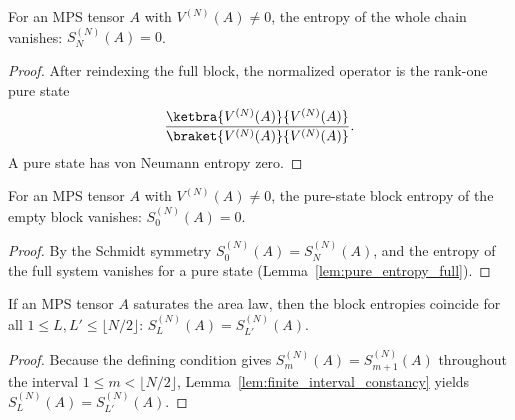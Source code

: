 \begin{lemma}
    \label{lem:pure_entropy_full}
    \leanok
    For an MPS tensor $A$ with $V^{(N)}(A)\neq0$, the entropy of the whole chain
    vanishes: $S_N^{(N)}(A)=0$.
\end{lemma}
\begin{proof}\leanok
    After reindexing the full block, the normalized operator is the rank-one
    pure state
    \begin{align}
        \frac{\ketbra{V^{(N)}(A)}{V^{(N)}(A)}}
        {\braket{V^{(N)}(A)}{V^{(N)}(A)}}.
        \notag
    \end{align}
    A pure state has von Neumann entropy zero.
\end{proof}

\begin{lemma}
    \label{lem:pure_block_entropy_empty}
    \leanok
    For an MPS tensor $A$ with $V^{(N)}(A)\neq0$, the pure-state block entropy of
    the empty block vanishes: $S_0^{(N)}(A)=0$.
\end{lemma}
\begin{proof}\leanok
    By the Schmidt symmetry $S_0^{(N)}(A)=S_N^{(N)}(A)$, and the entropy of the
    full system vanishes for a pure state
    (Lemma~\ref{lem:pure_entropy_full}).
\end{proof}

\begin{lemma}
    \label{lem:pure_sal_const}
    \leanok
    If an MPS tensor $A$ saturates the area law, then the block entropies
    coincide for all $1\le L,L'\le\lfloor N/2\rfloor$:
    $S_L^{(N)}(A)=S_{L'}^{(N)}(A)$.
\end{lemma}
\begin{proof}\leanok
    Because the defining condition gives
    $S_m^{(N)}(A)=S_{m+1}^{(N)}(A)$ throughout the interval
    $1\le m<\lfloor N/2\rfloor$, Lemma~\ref{lem:finite_interval_constancy}
    yields $S_L^{(N)}(A)=S_{L'}^{(N)}(A)$.
\end{proof}

